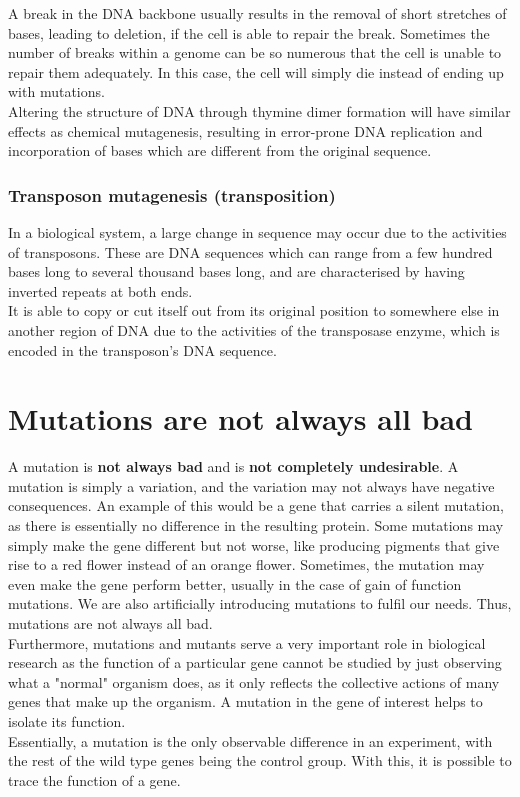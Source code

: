 \documentclass[11pt]{article}
\begin{document}
A break in the DNA backbone usually results in the removal of short stretches of bases, leading to deletion, if the cell is able to repair the break. Sometimes the number of breaks within a genome can be so numerous that the cell is unable to repair them adequately. In this case, the cell will simply die instead of ending up with mutations.
\\[0pt]

Altering the structure of DNA through thymine dimer formation will have similar effects as chemical mutagenesis, resulting in error-prone DNA replication and incorporation of bases which are different from the original sequence.

\subsubsection{Transposon mutagenesis (transposition)}
\label{sec:org74a277e}
In a biological system, a large change in sequence may occur due to the activities of transposons. These are DNA sequences which can range from a few hundred bases long to several thousand bases long, and are characterised by having inverted repeats at both ends.
\\[0pt]

It is able to copy or cut itself out from its original position to somewhere else in another region of DNA due to the activities of the transposase enzyme, which is encoded in the transposon's DNA sequence.

\newpage

\section{Mutations are not always all bad}
\label{sec:org1bf9e67}
A mutation is \textbf{not always bad} and is \textbf{not completely undesirable}. A mutation is simply a variation, and the variation may not always have negative consequences. An example of this would be a gene that carries a silent mutation, as there is essentially no difference in the resulting protein. Some mutations may simply make the gene different but not worse, like producing pigments that give rise to a red flower instead of an orange flower. Sometimes, the mutation may even make the gene perform better, usually in the case of gain of function mutations. We are also artificially introducing mutations to fulfil our needs. Thus, mutations are not always all bad.
\\[0pt]

Furthermore, mutations and mutants serve a very important role in biological research as the function of a particular gene cannot be studied by just observing what a "normal" organism does, as it only reflects the collective actions of many genes that make up the organism. A mutation in the gene of interest helps to isolate its function.
\\[0pt]

Essentially, a mutation is the only observable difference in an experiment, with the rest of the wild type genes being the control group. With this, it is possible to trace the function of a gene.
\end{document}
